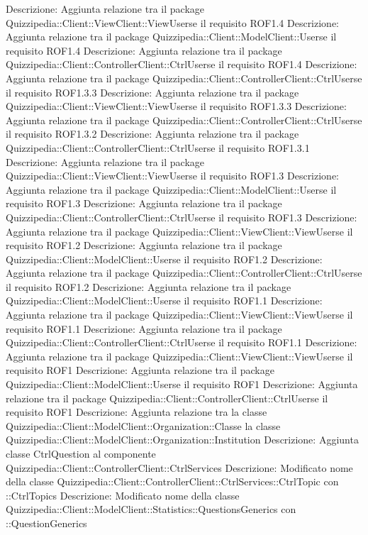 Descrizione: Aggiunta relazione tra il package Quizzipedia::Client::ViewClient::ViewUserse il requisito ROF1.4 
Descrizione: Aggiunta relazione tra il package Quizzipedia::Client::ModelClient::Userse il requisito ROF1.4 
Descrizione: Aggiunta relazione tra il package Quizzipedia::Client::ControllerClient::CtrlUserse il requisito ROF1.4 
Descrizione: Aggiunta relazione tra il package Quizzipedia::Client::ControllerClient::CtrlUserse il requisito ROF1.3.3 
Descrizione: Aggiunta relazione tra il package Quizzipedia::Client::ViewClient::ViewUserse il requisito ROF1.3.3 
Descrizione: Aggiunta relazione tra il package Quizzipedia::Client::ControllerClient::CtrlUserse il requisito ROF1.3.2 
Descrizione: Aggiunta relazione tra il package Quizzipedia::Client::ControllerClient::CtrlUserse il requisito ROF1.3.1 
Descrizione: Aggiunta relazione tra il package Quizzipedia::Client::ViewClient::ViewUserse il requisito ROF1.3 
Descrizione: Aggiunta relazione tra il package Quizzipedia::Client::ModelClient::Userse il requisito ROF1.3 
Descrizione: Aggiunta relazione tra il package Quizzipedia::Client::ControllerClient::CtrlUserse il requisito ROF1.3 
Descrizione: Aggiunta relazione tra il package Quizzipedia::Client::ViewClient::ViewUserse il requisito ROF1.2 
Descrizione: Aggiunta relazione tra il package Quizzipedia::Client::ModelClient::Userse il requisito ROF1.2 
Descrizione: Aggiunta relazione tra il package Quizzipedia::Client::ControllerClient::CtrlUserse il requisito ROF1.2 
Descrizione: Aggiunta relazione tra il package Quizzipedia::Client::ModelClient::Userse il requisito ROF1.1 
Descrizione: Aggiunta relazione tra il package Quizzipedia::Client::ViewClient::ViewUserse il requisito ROF1.1 
Descrizione: Aggiunta relazione tra il package Quizzipedia::Client::ControllerClient::CtrlUserse il requisito ROF1.1 
Descrizione: Aggiunta relazione tra il package Quizzipedia::Client::ViewClient::ViewUserse il requisito ROF1 
Descrizione: Aggiunta relazione tra il package Quizzipedia::Client::ModelClient::Userse il requisito ROF1 
Descrizione: Aggiunta relazione tra il package Quizzipedia::Client::ControllerClient::CtrlUserse il requisito ROF1 
Descrizione: Aggiunta relazione tra la classe Quizzipedia::Client::ModelClient::Organization::Classe la classe Quizzipedia::Client::ModelClient::Organization::Institution 
Descrizione: Aggiunta classe CtrlQuestion al componente Quizzipedia::Client::ControllerClient::CtrlServices 
Descrizione: Modificato nome della classe Quizzipedia::Client::ControllerClient::CtrlServices::CtrlTopic con ::CtrlTopics 
Descrizione: Modificato nome della classe Quizzipedia::Client::ModelClient::Statistics::QuestionsGenerics con ::QuestionGenerics 
